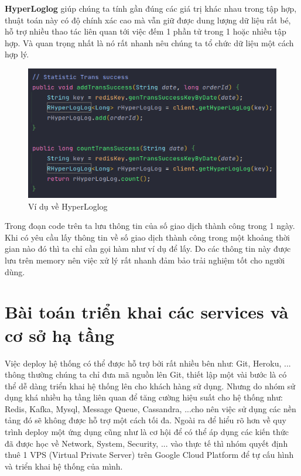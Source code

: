                 \textbf{HyperLoglog} giúp chúng ta tính gần đúng các giá trị khác nhau trong tập hợp, thuật toán này có độ chính xác cao mà vẫn giữ được dung lượng dữ liệu rất bé, hỗ trợ nhiều thao tác liên quan tới việc đếm 1 phần tử trong 1 hoặc nhiều tập hợp. Và quan trọng nhất là nó rất nhanh nêu chúng ta tổ chức dữ liệu một cách hợp lý.\\
                
                \begin{figure}[H]
			    \includegraphics[width=1\textwidth]{Images/hyperloglog.png}
			    \centering
			    \linebreak
			    \caption{Ví dụ về HyperLoglog}
	       	    \end{figure}
	       	
	       	    Trong đoạn code trên ta lưu thông tin của số giao dịch thành công trong 1 ngày. Khi có yêu cầu lấy thông tin về số giao dịch thành công trong một khoảng thời gian nào đó thì ta chỉ cần gọi hàm như ví dụ để lấy. Do các thông tin này được lưu trên memory nên việc xử lý rất nhanh đảm bảo trải nghiệm tốt cho người dùng.
		  
		  \section{Bài toán triển khai các services và cơ sở hạ tầng}
		 
		  
		  Việc deploy hệ thống có thể được hỗ trợ bởi rất nhiều bên như: Git, Heroku, ... thông thường chúng ta chỉ đưa mã nguồn lên Git, thiết lập một vài bước là có thể dễ dàng triển khai hệ thống lên cho khách hàng sử dụng. Nhưng do nhóm sử dụng khá nhiều hạ tầng liên quan để tăng cường hiệu suất cho hệ thống như: Redis, Kafka, Mysql, Message Queue, Cassandra, ...cho nên việc sử dụng các nền tảng đó sẽ không được hỗ trợ một cách tối đa. Ngoài ra để hiểu rõ hơn về quy trình deploy một ứng dụng cũng như là cơ hội để có thể áp dụng các kiến thức đã được học về Network, System, Security, ... vào thực tế thì nhóm quyết định thuê 1 VPS (Virtual Private Server) trên Google Cloud Platform để tự cấu hình và triển khai hệ thống của mình.\\
		  
